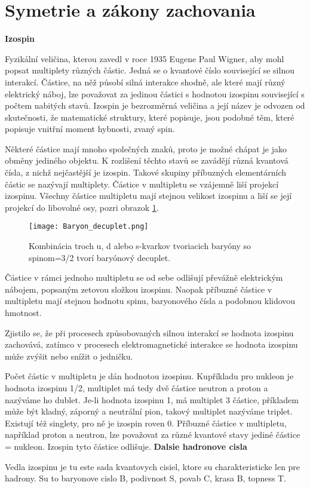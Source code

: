 \documentclass[../../main.tex]{subfiles}
\begin{document}
\section{Symetrie a zákony zachovania}
\textbf{Izospin}\par
Fyzikální veličina, kterou zavedl v roce 1935 Eugene Paul Wigner, aby mohl popsat multiplety různých částic. Jedná se o kvantové číslo související se silnou interakcí. Částice, na něž působí silná interakce shodně, ale které mají různý elektrický náboj, lze považovat za jedinou částici s hodnotou izospinu související s počtem nabitých stavů. Izospin je bezrozměrná veličina a její název je odvozen od skutečnosti, že matematické struktury, které popisuje, jsou podobné těm, které popisuje vnitřní moment hybnosti, zvaný spin.\par
Některé částice mají mnoho společných znaků, proto je možné chápat je jako obměny jediného objektu. K rozlišení těchto stavů se zavádějí různá kvantová čísla, z nichž nejčastější je izospin. Takové skupiny příbuzných elementárních částic se nazývají multiplety. Částice v multipletu se vzájemně liší projekcí izospinu. Všechny částice multipletu mají stejnou velikost izospinu a liší se její projekcí do libovolné osy, pozri obrazok \ref{sf1:fig:Baryon_decuplet}.\par
\begin{figure}[!h]
\centering
\texttt{[image: Baryon\_decuplet.png]}
\caption{Kombinácia troch u, d alebo s-kvarkov tvoriacich baryóny so spinom=3/2 tvorí baryónový decuplet.}
\label{sf1:fig:Baryon_decuplet}
\end{figure}
Částice v rámci jednoho multipletu se od sebe odlišují převážně elektrickým nábojem, popsaným zetovou složkou izospinu. Naopak příbuzné částice v multipletu mají stejnou hodnotu spinu, baryonového čísla a podobnou klidovou hmotnost.\par
Zjistilo se, že při procesech způsobovaných silnou interakcí se hodnota izospinu zachovává, zatímco v procesech elektromagnetické interakce se hodnota izospinu může zvýšit nebo snížit o jedničku.\par
Počet částic v multipletu je dán hodnotou izospinu. Kupříkladu pro nukleon je hodnota izospinu 1/2, multiplet má tedy dvě částice neutron a proton a nazýváme ho dublet. Je-li hodnota izospinu 1, má multiplet 3 částice, příkladem může být kladný, záporný a neutrální pion, takový multiplet nazýváme triplet. Existují též singlety, pro ně je izospin roven 0. Příbuzné částice v multipletu, například proton a neutron, lze považovat za různé kvantové stavy jediné částice = nukleon. Izospin tyto částice odlišuje.\newline
\textbf{Dalsie hadronove cisla}\par
Vedla izospinu je tu este sada kvantovych cisiel, ktore su charakteristicke len pre hadrony. Su to baryonove cislo B, podivnost S, povab C, krasa B, topness T. 
\end{document}
